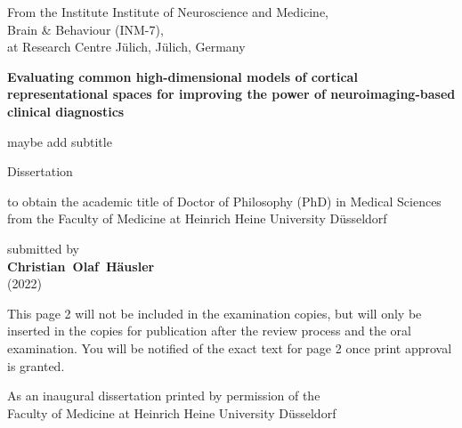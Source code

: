 \documentclass[english,12pt]{report}
\begin{document}
\pagestyle{plain}
\begin{spacing}{1.5}




\begin{titlepage}
\begin{center}

From the Institute Institute of Neuroscience and Medicine,\\
Brain \& Behaviour (INM-7),\\
at Research Centre Jülich, Jülich, Germany

\vfill

\textbf{{\large Evaluating common high-dimensional models of cortical
representational spaces for improving the power of neuroimaging-based
clinical diagnostics}}

maybe add subtitle

\vfill

{\large Dissertation}

\vfill

to obtain the academic title of Doctor of Philosophy (PhD) in Medical Sciences\\
from the Faculty of Medicine at Heinrich Heine University Düsseldorf

\vfill

submitted by\\
\textbf{Christian~Olaf~Häusler}\\
(2022)

\end{center}
\end{titlepage}




\newpage

\noindent This page 2 will not be included in the examination copies, but will
only be inserted in the copies for publication after the review process and
the oral examination. You will be notified of the exact text for page 2 once
print approval is granted.

\vfill
\noindent As an inaugural dissertation printed by permission of the\\
Faculty of Medicine at Heinrich Heine University Düsseldorf


\end{spacing}
\end{document}
